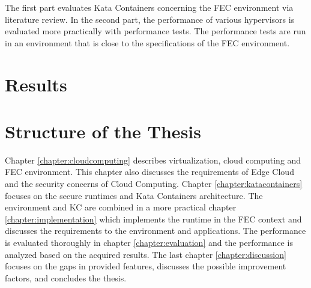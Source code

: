The first part evaluates Kata Containers concerning the FEC environment via literature review. In the second part, the performance of various hypervisors is evaluated more practically with performance tests. The performance tests are run in an environment that is close to the specifications of the FEC environment.

\section{Results}
\label{section:intro_results}

\section{Structure of the Thesis}
\label{section:intro_structure}

Chapter \ref{chapter:cloudcomputing} describes virtualization, cloud computing and FEC environment. This chapter also discusses the requirements of Edge Cloud and the security concerns of Cloud Computing. Chapter \ref{chapter:katacontainers} focuses on the secure runtimes and Kata Containers architecture. The environment and KC are combined in a more practical chapter \ref{chapter:implementation} which implements the runtime in the FEC context and discusses the requirements to the environment and applications. The performance is evaluated thoroughly in chapter \ref{chapter:evaluation} and the performance is analyzed based on the acquired results. The last chapter \ref{chapter:discussion} focuses on the gaps in provided features, discusses the possible improvement factors, and concludes the thesis.


